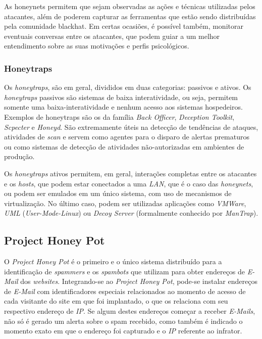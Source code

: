 As honeynets permitem que sejam observadas as ações e técnicas utilizadas pelos atacantes, além de poderem capturar as ferramentas que estão sendo distribuídas pela comunidade blackhat. Em certas ocasiões, é possível também, monitorar eventuais conversas entre os atacantes, que podem guiar a um melhor entendimento sobre as suas motivações e perfis psicológicos.

\subsubsection{Honeytraps}

Os \textit{honeytraps}, são em geral, divididos em duas categorias: passivos e ativos. Os \textit{honeytraps} passivos são sistemas de baixa interatividade, ou seja, permitem somente uma baixa-interatividade e nenhum acesso aos sistemas hospedeiros. Exemplos de honeytraps são os da família \textit{Back Officer}, \textit{Deception Toolkit}, \textit{Scpecter} e \textit{Honeyd}. São extremamente úteis na detecção de tendências de ataques, atividades de \textit{scan} e servem como agentes para o disparo de alertas prematuros ou como sistemas de detecção de atividades não-autorizadas em ambientes de produção.

Os \textit{honeytraps} ativos permitem, em geral, interações completas entre os atacantes e os \textit{hosts}, que podem estar conectados a uma \textit{LAN}, que é o caso das \textit{honeynets}, ou podem ser emulados em um único sistema, com uso de mecanismos de virtualização. No último caso, podem ser utilizadas aplicações como \textit{VMWare}, \textit{UML} (\textit{User-Mode-Linux}) ou \textit{Decoy Server} (formalmente conhecido por \textit{ManTrap}).


\subsection{Project Honey Pot}


O \textit{Project Honey Pot} é o primeiro e o único sistema distribuído para a identificação de \textit{spammers} e os \textit{spambots} que utilizam para obter endereços de \textit{E-Mail} dos \textit{websites}. Integrando-se ao \textit{Project Honey Pot}, pode-se instalar endereços de \textit{E-Mail} com identificadores especiais relacionados ao momento de acesso de cada visitante do site em que foi implantado, o que os relaciona com seu respectivo endereço de \textit{IP}. Se algum destes endereços começar a receber \textit{E-Mails}, não só é gerado um alerta sobre o spam recebido, como também é indicado o momento exato em que o endereço foi capturado e o \textit{IP} referente ao infrator.

